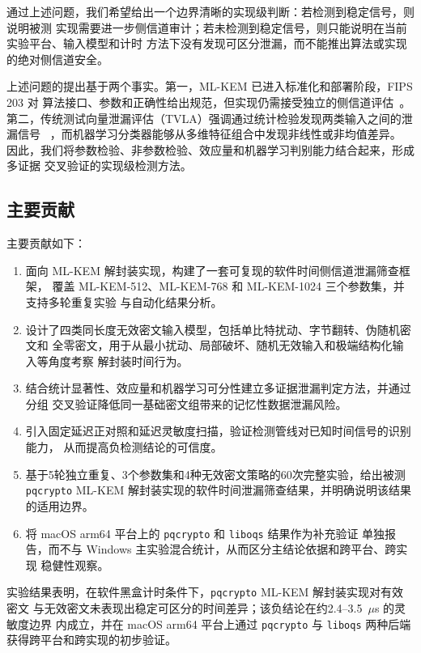 \documentclass[a4paper,fontset=none]{ctexart}
\begin{document}
通过上述问题，我们希望给出一个边界清晰的实现级判断：若检测到稳定信号，则说明被测
实现需要进一步侧信道审计；若未检测到稳定信号，则只能说明在当前实验平台、输入模型和计时
方法下没有发现可区分泄漏，而不能推出算法或实现的绝对侧信道安全。

上述问题的提出基于两个事实。第一，ML-KEM 已进入标准化和部署阶段，FIPS 203 对
算法接口、参数和正确性给出规范，但实现仍需接受独立的侧信道评估~\cite{FIPS203}。
第二，传统测试向量泄漏评估（TVLA）强调通过统计检验发现两类输入之间的泄漏信号
~\cite{Becker2013}，而机器学习分类器能够从多维特征组合中发现非线性或非均值差异。
因此，我们将参数检验、非参数检验、效应量和机器学习判别能力结合起来，形成多证据
交叉验证的实现级检测方法。

\subsection{主要贡献}

主要贡献如下：

\begin{enumerate}
  \item 面向 ML-KEM 解封装实现，构建了一套可复现的软件时间侧信道泄漏筛查框架，
        覆盖 ML-KEM-512、ML-KEM-768 和 ML-KEM-1024 三个参数集，并支持多轮重复实验
        与自动化结果分析。
  \item 设计了四类同长度无效密文输入模型，包括单比特扰动、字节翻转、伪随机密文和
        全零密文，用于从最小扰动、局部破坏、随机无效输入和极端结构化输入等角度考察
        解封装时间行为。
  \item 结合统计显著性、效应量和机器学习可分性建立多证据泄漏判定方法，并通过分组
        交叉验证降低同一基础密文组带来的记忆性数据泄漏风险。
  \item 引入固定延迟正对照和延迟灵敏度扫描，验证检测管线对已知时间信号的识别能力，
        从而提高负检测结论的可信度。
  \item 基于5轮独立重复、3个参数集和4种无效密文策略的60次完整实验，给出被测
        \texttt{pqcrypto} ML-KEM 解封装实现的软件时间泄漏筛查结果，并明确说明该结果
        的适用边界。
  \item 将 macOS arm64 平台上的 \texttt{pqcrypto} 和 \texttt{liboqs} 结果作为补充验证
        单独报告，而不与 Windows 主实验混合统计，从而区分主结论依据和跨平台、跨实现
        稳健性观察。
\end{enumerate}

实验结果表明，在软件黑盒计时条件下，\texttt{pqcrypto} ML-KEM 解封装实现对有效密文
与无效密文未表现出稳定可区分的时间差异；该负结论在约2.4--3.5~$\mu$s 的灵敏度边界
内成立，并在 macOS arm64 平台上通过 \texttt{pqcrypto} 与 \texttt{liboqs} 两种后端
获得跨平台和跨实现的初步验证。
\end{document}
